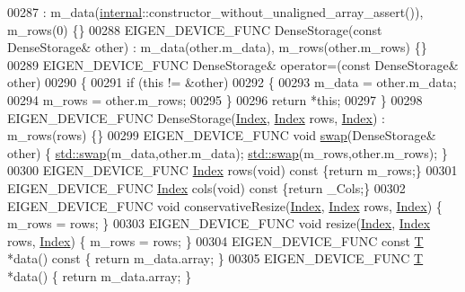 \begin{DoxyCode}
00287       : m\_data(\hyperlink{namespaceinternal}{internal}::constructor\_without\_unaligned\_array\_assert()), m\_rows(0) \{\}
00288     EIGEN\_DEVICE\_FUNC DenseStorage(\textcolor{keyword}{const} DenseStorage& other) : m\_data(other.m\_data), m\_rows(other.m\_rows) 
      \{\}
00289     EIGEN\_DEVICE\_FUNC DenseStorage& operator=(\textcolor{keyword}{const} DenseStorage& other) 
00290     \{
00291       \textcolor{keywordflow}{if} (\textcolor{keyword}{this} != &other)
00292       \{
00293         m\_data = other.m\_data;
00294         m\_rows = other.m\_rows;
00295       \}
00296       \textcolor{keywordflow}{return} *\textcolor{keyword}{this}; 
00297     \}
00298     EIGEN\_DEVICE\_FUNC DenseStorage(\hyperlink{namespace_eigen_a62e77e0933482dafde8fe197d9a2cfde}{Index}, \hyperlink{namespace_eigen_a62e77e0933482dafde8fe197d9a2cfde}{Index} rows, \hyperlink{namespace_eigen_a62e77e0933482dafde8fe197d9a2cfde}{Index}) : m\_rows(rows) \{\}
00299     EIGEN\_DEVICE\_FUNC \textcolor{keywordtype}{void} \hyperlink{endian_8c_a3ca5ecd34b04d6a243c054ac3a57f68d}{swap}(DenseStorage& other) \{ \hyperlink{endian_8c_a3ca5ecd34b04d6a243c054ac3a57f68d}{std::swap}(m\_data,other.m\_data); 
      \hyperlink{endian_8c_a3ca5ecd34b04d6a243c054ac3a57f68d}{std::swap}(m\_rows,other.m\_rows); \}
00300     EIGEN\_DEVICE\_FUNC \hyperlink{namespace_eigen_a62e77e0933482dafde8fe197d9a2cfde}{Index} rows(\textcolor{keywordtype}{void})\textcolor{keyword}{ const }\{\textcolor{keywordflow}{return} m\_rows;\}
00301     EIGEN\_DEVICE\_FUNC \hyperlink{namespace_eigen_a62e77e0933482dafde8fe197d9a2cfde}{Index} cols(\textcolor{keywordtype}{void})\textcolor{keyword}{ const }\{\textcolor{keywordflow}{return} \_Cols;\}
00302     EIGEN\_DEVICE\_FUNC \textcolor{keywordtype}{void} conservativeResize(\hyperlink{namespace_eigen_a62e77e0933482dafde8fe197d9a2cfde}{Index}, \hyperlink{namespace_eigen_a62e77e0933482dafde8fe197d9a2cfde}{Index} rows, \hyperlink{namespace_eigen_a62e77e0933482dafde8fe197d9a2cfde}{Index}) \{ m\_rows = rows; \}
00303     EIGEN\_DEVICE\_FUNC \textcolor{keywordtype}{void} resize(\hyperlink{namespace_eigen_a62e77e0933482dafde8fe197d9a2cfde}{Index}, \hyperlink{namespace_eigen_a62e77e0933482dafde8fe197d9a2cfde}{Index} rows, \hyperlink{namespace_eigen_a62e77e0933482dafde8fe197d9a2cfde}{Index}) \{ m\_rows = rows; \}
00304     EIGEN\_DEVICE\_FUNC \textcolor{keyword}{const} \hyperlink{group___sparse_core___module_class_eigen_1_1_triplet}{T} *data()\textcolor{keyword}{ const }\{ \textcolor{keywordflow}{return} m\_data.array; \}
00305     EIGEN\_DEVICE\_FUNC \hyperlink{group___sparse_core___module_class_eigen_1_1_triplet}{T} *data() \{ \textcolor{keywordflow}{return} m\_data.array; \}

\end{DoxyCode}
